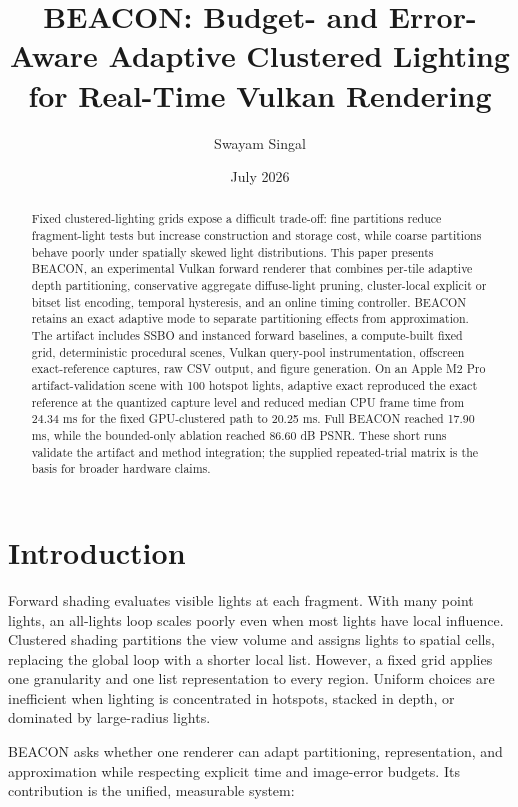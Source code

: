 \documentclass[10pt,twocolumn]{article}
\title{BEACON: Budget- and Error-Aware Adaptive Clustered Lighting for Real-Time Vulkan Rendering}
\author{Swayam Singal}
\date{July 2026}
\begin{document}
\maketitle

\begin{abstract}
Fixed clustered-lighting grids expose a difficult trade-off: fine partitions reduce fragment-light
tests but increase construction and storage cost, while coarse partitions behave poorly under
spatially skewed light distributions. This paper presents BEACON, an experimental Vulkan forward
renderer that combines per-tile adaptive depth partitioning, conservative aggregate diffuse-light
pruning, cluster-local explicit or bitset list encoding, temporal hysteresis, and an online timing
controller. BEACON retains an exact adaptive mode to separate partitioning effects from
approximation. The artifact includes SSBO and instanced forward baselines, a compute-built fixed
grid, deterministic procedural scenes, Vulkan query-pool instrumentation, offscreen exact-reference
captures, raw CSV output, and figure generation. On an Apple M2 Pro artifact-validation scene with
100 hotspot lights, adaptive exact reproduced the exact reference at the quantized capture level and
reduced median CPU frame time from 24.34 ms for the fixed GPU-clustered path to 20.25 ms. Full
BEACON reached 17.90 ms, while the bounded-only ablation reached 86.60 dB PSNR. These short runs validate the artifact and
method integration; the supplied repeated-trial matrix is the basis for broader hardware claims.
\end{abstract}

\section{Introduction}
Forward shading evaluates visible lights at each fragment. With many point lights, an all-lights
loop scales poorly even when most lights have local influence. Clustered shading partitions the view
volume and assigns lights to spatial cells, replacing the global loop with a shorter local list.
However, a fixed grid applies one granularity and one list representation to every region. Uniform
choices are inefficient when lighting is concentrated in hotspots, stacked in depth, or dominated by
large-radius lights.

BEACON asks whether one renderer can adapt partitioning, representation, and approximation while
respecting explicit time and image-error budgets. Its contribution is the unified, measurable system:
\end{document}
